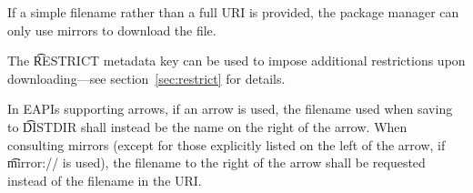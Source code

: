 If a simple filename rather than a full URI is provided, the package manager can only use mirrors to
download the file.

The \t{RESTRICT} metadata key can be used to impose additional restrictions upon downloading---see
section~\ref{sec:restrict} for details.

 In EAPIs supporting arrows, if an arrow is used, the filename used
when saving to \t{DISTDIR} shall instead be the name on the right of the arrow. When consulting
mirrors (except for those explicitly listed on the left of the arrow, if \t{mirror://} is used), the
filename to the right of the arrow shall be requested instead of the filename in the URI.


